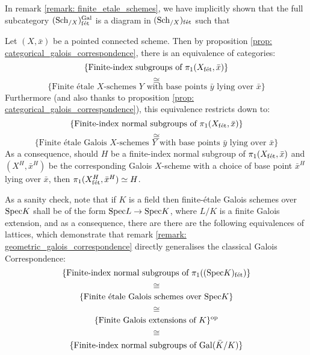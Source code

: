         \begin{remark} \label{remark: etale_fundamental_groups_as_automorphism_groups_of_universal_covers}
            In remark \ref{remark: finite_etale_schemes}, we have implicitly shown that the full subcategory $(\mathrm{Sch}_{/X})_{\mathrm{f\acute{e}t}}^{\mathrm{Gal}}$ is a diagram in $(\mathrm{Sch}_{/X})_{\mathrm{f\acute{e}t}}$ such that  
        \end{remark}
        \begin{remark} \label{remark: geometric_galois_correspondence}
            Let $(X, \bar{x})$ be a pointed connected scheme. Then by proposition \ref{prop: categorical_galois_correspondence}, there is an equivalence of categories:
                $$\{\text{Finite-index subgroups of $\pi_1(X_{\mathrm{f\acute{e}t}}, \bar{x})$}\}$$
                $$\cong$$
                $$\{\text{Finite \'etale $X$-schemes $Y$ with base points $\bar{y}$ lying over $\bar{x}$}\}$$
            Furthermore (and also thanks to proposition \ref{prop: categorical_galois_correspondence}), this equivalence restricts down to:
                $$\{\text{Finite-index normal subgroups of $\pi_1(X_{\mathrm{f\acute{e}t}}, \bar{x})$}\}$$
                $$\cong$$
                $$\{\text{Finite \'etale Galois $X$-schemes $Y$ with base points $\bar{y}$ lying over $\bar{x}$}\}$$
            As a consequence, should $H$ be a finite-index normal subgroup of $\pi_1(X_{\mathrm{f\acute{e}t}}, \bar{x})$ and $(X^H, \bar{x}^H)$ be the corresponding Galois $X$-scheme with a choice of base point $\bar{x}^H$ lying over $\bar{x}$, then $\pi_1(X^H_{\mathrm{f\acute{e}t}}, \bar{x}^H) \simeq H$. 
        \end{remark}
        \begin{example} \label{example: etale_fundamental_group_of_a_field}
            As a sanity check, note that if $K$ is a field then finite-\'etale Galois schemes over $\mathrm{Spec} K$ shall be of the form $\mathrm{Spec} L \to \mathrm{Spec} K$, where $L/K$ is a finite Galois extension, and as a consequence, there are there are the following equivalences of lattices, which demonstrate that remark \ref{remark: geometric_galois_correspondence} directly generalises the classical Galois Correspondence:
                $$\{\text{Finite-index normal subgroups of $\pi_1((\mathrm{Spec} K)_{\mathrm{f\acute{e}t}})$}\}$$
                $$\cong$$
                $$\{\text{Finite \'etale Galois schemes over $\mathrm{Spec} K$}\}$$
                $$\cong$$
                $$\{\text{Finite Galois extensions of $K$}\}^{\mathrm{op}}$$
                $$\cong$$
                $$\{\text{Finite-index normal subgroups of $\mathrm{Gal}(\bar{K}/K)$}\}$$
        \end{example}
